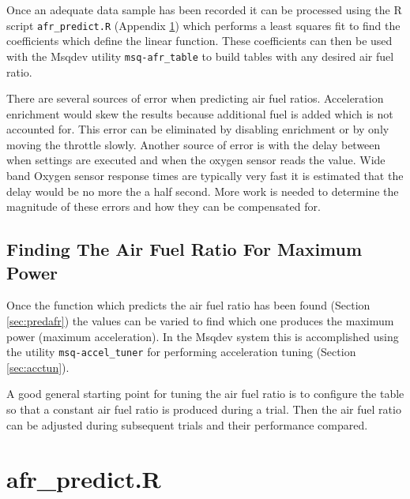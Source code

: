 \documentclass{article}
\begin{document}
Once an adequate data sample has been recorded it can be processed 
using the R script \verb+afr_predict.R+ (Appendix \ref{app:afrpred})
which performs a least squares fit to find the coefficients which define
the linear function.
These coefficients can then be used with the Msqdev utility \verb+msq-afr_table+
to build tables with any desired air fuel ratio.



There are several sources of error when predicting air fuel ratios.
Acceleration enrichment would skew the results because additional
fuel is added which is not accounted for.
This error can be eliminated by disabling enrichment or by only
moving the throttle slowly.
Another source of error is with the delay between when settings are
executed and when the oxygen sensor reads the value.
Wide band Oxygen sensor response times are typically very fast it
is estimated that the delay would be no more the a half second.
More work is needed to determine the magnitude of these errors and
how they can be compensated for.

\FloatBarrier  %

\subsection{Finding The Air Fuel Ratio For Maximum Power}
\label{sec:findafrpow}

Once the function which predicts the air fuel ratio has been found
(Section \ref{sec:predafr}) the values can be varied to find which
one produces the maximum power (maximum acceleration).
In the Msqdev system this is accomplished using the utility
\verb+msq-accel_tuner+ for performing acceleration tuning (Section \ref{sec:acctun}).

A good general starting point for tuning the air fuel ratio is to
configure the table so that a constant air fuel ratio is produced
during a trial.
Then the air fuel ratio can be adjusted during subsequent trials and
their performance compared.

\appendix
\section{afr\_predict.R}
\label{app:afrpred}



\pagebreak


%
%
%

\end{document}
